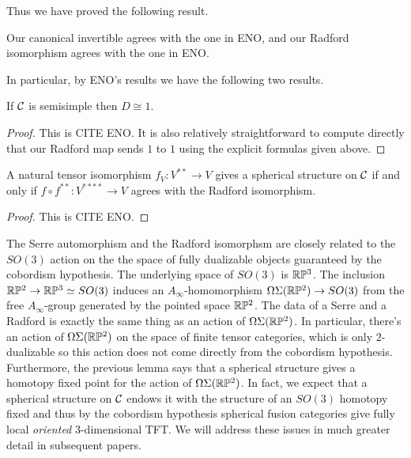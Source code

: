 \documentclass{amsart}
\begin{document}
Thus we have proved the following result.

\begin{lemma}
Our canonical invertible agrees with the one in ENO, and our Radford isomorphism agrees with the one in ENO.
\end{lemma}

In particular, by ENO's results we have the following two results.

\begin{lemma}
If $\mathcal C$ is semisimple then $D \cong 1$.
\end{lemma}
\begin{proof}
This is CITE ENO.  It is also relatively straightforward to compute directly that our Radford map sends $1$ to $1$ using the explicit formulas given above.
\end{proof}


\begin{lemma}
A natural tensor isomorphism $f_V: V^{**} \rightarrow V$ gives a spherical structure on $\mathcal C$ if and only if $f \circ f^{**}: V^{****} \rightarrow V$ agrees with the Radford isomorphism.
\end{lemma}
\begin{proof}
This is CITE ENO.
\end{proof}

\begin{remark}
The Serre automorphism and the Radford isomorphsm are closely related to the $SO(3)$ action on the the space of fully dualizable objects guaranteed by the cobordism hypothesis.  The underlying space of $SO(3)$ is $\mathbb R \mathbb P^3$. The inclusion $\mathbb R \mathbb P^2 \to \mathbb R \mathbb P^3 \simeq SO(3)$ induces an $A_\infty$-homomorphism $\Omega \Sigma (\mathbb R \mathbb P^2) \to SO(3)$ from the free $A_\infty$-group generated by the pointed space $\mathbb R \mathbb P^2$.  The data of a Serre and a Radford is exactly the same thing as an action of $\Omega \Sigma (\mathbb R \mathbb P^2)$.  In particular, there's an action of $\Omega \Sigma (\mathbb R \mathbb P^2)$ on the space of finite tensor categories, which is only $2$-dualizable so this action does not come directly from the cobordism hypothesis.  Furthermore, the previous lemma says that a spherical structure gives a homotopy fixed point for the action of $\Omega \Sigma (\mathbb R \mathbb P^2)$.  In fact, we expect that a spherical structure on $\mathcal C$ endows it with the structure of an $SO(3)$ homotopy fixed and thus by the cobordism hypothesis spherical fusion categories give fully local \emph{oriented} $3$-dimensional TFT.  We will address these issues in much greater detail in subsequent papers.
\end{remark}
\end{document}
